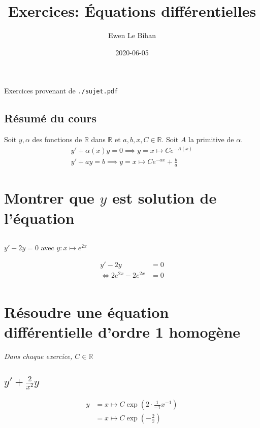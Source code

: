 \documentclass{article}
\title{Exercices: Équations différentielles}
\author{Ewen Le Bihan}
\date{2020-06-05}
\newcommand{\R}{\mathds{R}}
\begin{document}
\maketitle

\abstract{}
Exercices provenant de \texttt{./sujet.pdf}

\subsection*{Résumé du cours}

Soit $y, \alpha$ des fonctions de $\R$ dans $\R$ et $a, b, x, C \in \R$.
Soit $A$ la primitive de $\alpha$.
\begin{align*}
	y' + \alpha(x)y = 0 \implies y = x \mapsto Ce^{-A(x)} \\
	y' + ay = b \implies y = x \mapsto Ce^{-ax} + \frac{b}{a}
\end{align*}


\section{Montrer que $y$ est solution de l'équation}
\subsection{}

$y'-2y=0$ avec  $y:x\mapsto e^{2x}$

\begin{align*}
	y' - 2y &= 0 \\
	\iff 2e^{2x} - 2e^{2x} &= 0 \\
\end{align*}

\subsection{}

\section{Résoudre une équation différentielle d'ordre 1 homogène}

\emph{Dans chaque exercice, $C \in \R$} 

\subsection{$y'+\frac{2}{x^2}y$}

\begin{align*}
	y &= x \mapsto C\exp\left( {2\cdot \frac{1}{-1}x^{-1}} \right)  \\
	  &= x \mapsto C \exp\left( -\frac{2}{x} \right)  \\
\end{align*}
\end{document}
